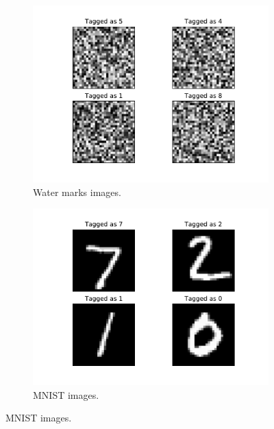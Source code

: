 \documentclass[a4paper]{llncs}
\begin{document}
\begin{figure}[h!]
  \centering
  \begin{subfigure}{0.4\linewidth}
    \includegraphics[width=\linewidth]{../data/wm.pdf}
     \caption{Water marks images.}
  \end{subfigure}
  \begin{subfigure}{0.4\linewidth}
    \includegraphics[width=\linewidth]{../data/mnist.pdf}
    \caption{MNIST images.}
  \end{subfigure}
  
  \label{fig:imageExamples}
\end{figure}
\end{document}
